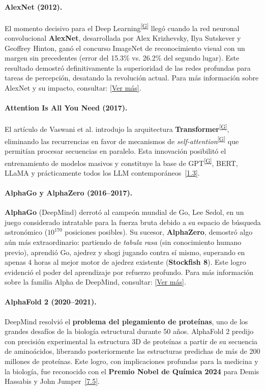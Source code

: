 \documentclass[12pt,a4paper]{report}
\numberwithin{figure}{section}
\begin{document}
\paragraph{AlexNet (2012).}
El momento decisivo para el Deep Learning\textsuperscript{\hyperref[glos:dl]{[G]}} llegó cuando la red neuronal convolucional \textbf{AlexNet}, desarrollada por Alex Krizhevsky, Ilya Sutskever y Geoffrey Hinton, ganó el concurso ImageNet de reconocimiento visual con un margen sin precedentes (error del 15.3\% vs. 26.2\% del segundo lugar). Este resultado demostró definitivamente la superioridad de las redes profundas para tareas de percepción, desatando la revolución actual. Para más información sobre AlexNet y su impacto, consultar: \href{https://papers.nips.cc/paper/2012/hash/c399862d3b9d6b76c8436e924a68c45b-Abstract.html}{[Ver más]}.

\paragraph{Attention Is All You Need (2017).}
El artículo de Vaswani et al. introdujo la arquitectura \textbf{Transformer}\textsuperscript{\hyperref[glos:transformer]{[G]}}, eliminando las recurrencias en favor de mecanismos de \textit{self-attention}\textsuperscript{\hyperref[glos:selfattention]{[G]}} que permitían procesar secuencias en paralelo. Esta innovación posibilitó el entrenamiento de modelos masivos y constituye la base de GPT\textsuperscript{\hyperref[glos:gpt]{[G]}}, BERT, LLaMA y prácticamente todos los LLM contemporáneos~\hyperref[ref:1]{[1.3]}.

\paragraph{AlphaGo y AlphaZero (2016--2017).}
\textbf{AlphaGo} (DeepMind) derrotó al campeón mundial de Go, Lee Sedol, en un juego considerado intratable para la fuerza bruta debido a su espacio de búsqueda astronómico ($10^{170}$ posiciones posibles). Su sucesor, \textbf{AlphaZero}, demostró algo aún más extraordinario: partiendo de \textit{tabula rasa} (sin conocimiento humano previo), aprendió Go, ajedrez y shogi jugando contra sí mismo, superando en apenas 4 horas al mejor motor de ajedrez existente (\textbf{Stockfish 8}). Este logro evidenció el poder del aprendizaje por refuerzo profundo. Para más información sobre la familia Alpha de DeepMind, consultar: \href{https://deepmind.google/technologies/alphago/}{[Ver más]}.

\paragraph{AlphaFold 2 (2020--2021).}
DeepMind resolvió el \textbf{problema del plegamiento de proteínas}, uno de los grandes desafíos de la biología estructural durante 50 años. AlphaFold 2 predijo con precisión experimental la estructura 3D de proteínas a partir de su secuencia de aminoácidos, liberando posteriormente las estructuras predichas de más de 200 millones de proteínas. Este logro, con implicaciones profundas para la medicina y la biología, fue reconocido con el \textbf{Premio Nobel de Química 2024} para Demis Hassabis y John Jumper~\hyperref[ref:7]{[7.5]}.
\end{document}
